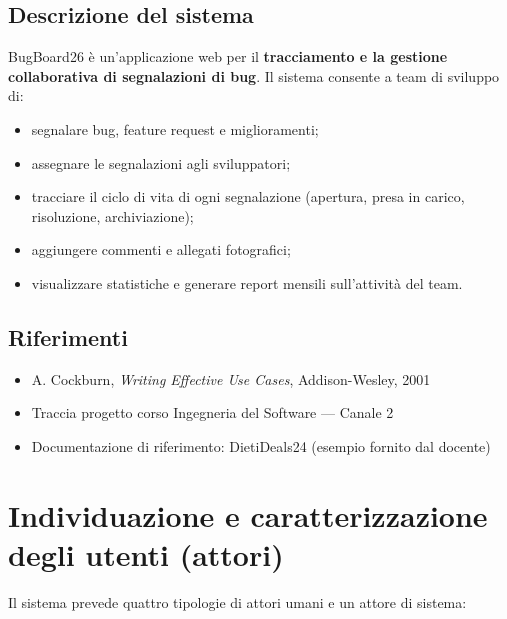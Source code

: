\documentclass[12pt,a4paper]{article}
\begin{document}
\subsection{Descrizione del sistema}
BugBoard26 è un'applicazione web per il \textbf{tracciamento e la gestione collaborativa di segnalazioni di bug}. Il sistema consente a team di sviluppo di:
\begin{itemize}
    \item segnalare bug, feature request e miglioramenti;
    \item assegnare le segnalazioni agli sviluppatori;
    \item tracciare il ciclo di vita di ogni segnalazione (apertura, presa in carico, risoluzione, archiviazione);
    \item aggiungere commenti e allegati fotografici;
    \item visualizzare statistiche e generare report mensili sull'attività del team.
\end{itemize}

\subsection{Riferimenti}
\begin{itemize}
    \item A. Cockburn, \textit{Writing Effective Use Cases}, Addison-Wesley, 2001
    \item Traccia progetto corso Ingegneria del Software --- Canale 2
    \item Documentazione di riferimento: DietiDeals24 (esempio fornito dal docente)
\end{itemize}



\section{Individuazione e caratterizzazione degli utenti (attori)}

Il sistema prevede quattro tipologie di attori umani e un attore di sistema:
\end{document}
